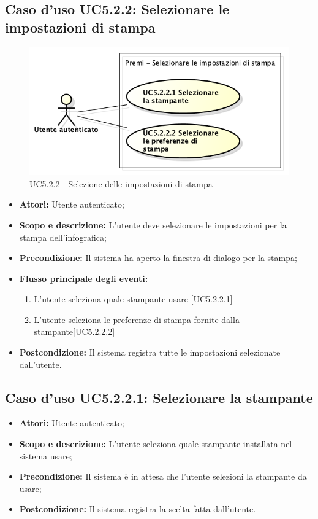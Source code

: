 		\subsection{Caso d'uso UC5.2.2: Selezionare le impostazioni di stampa}
		\begin{figure}[h] 
			\centering 
			\includegraphics[scale=0.45] {img/UC5.2.2.png} 
			\caption{UC5.2.2 - Selezione delle impostazioni di stampa} 
		\end{figure}
		
		\begin{itemize}
			\item \textbf{Attori:} Utente autenticato;
			\item \textbf{Scopo e descrizione:} L'utente deve selezionare le impostazioni per la stampa dell'infografica;
			\item \textbf{Precondizione:} Il sistema ha aperto la finestra di dialogo per la stampa;
			\item \textbf{Flusso principale degli eventi:}
			\begin{enumerate}
				\item L'utente seleziona quale stampante usare [UC5.2.2.1]
				\item L'utente seleziona le preferenze di stampa fornite dalla stampante[UC5.2.2.2]
			\end{enumerate}
		\item \textbf{Postcondizione:} Il sistema registra tutte le impostazioni selezionate dall'utente.
		\end{itemize}
		
			\subsection{Caso d'uso UC5.2.2.1: Selezionare la stampante}
			\begin{itemize}
				\item \textbf{Attori:} Utente autenticato;
				\item \textbf{Scopo e descrizione:} L'utente seleziona quale stampante installata nel sistema usare;
				\item \textbf{Precondizione:} Il sistema è in attesa che l'utente selezioni la stampante da usare;
				\item \textbf{Postcondizione:} Il sistema registra la scelta fatta dall'utente.
			\end{itemize}
			
